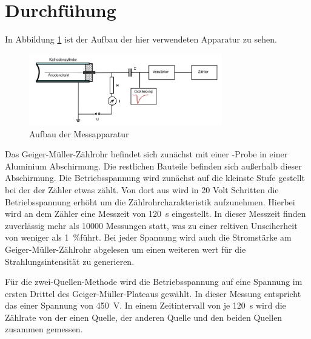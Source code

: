\section{Durchfühung}
In Abbildung \ref{fig:01_teo} ist der Aufbau der hier verwendeten Apparatur zu sehen.
\begin{figure}
    \centering
    \includegraphics[width = 0.75\textwidth]{14_v703/Abbildungen/Seite 2.pdf}
    \caption{Aufbau der Messapparatur \cite{man:v703}}
    \label{fig:01_teo}
\end{figure}
Das Geiger-Müller-Zählrohr befindet sich zunächst mit einer -Probe in einer Aluminium Abschirmung.
Die restlichen Bauteile befinden sich außerhalb dieser Abschirmung.
Die Betriebsspannung wird zunächst auf die kleinste Stufe gestellt bei der der Zähler etwas zählt.
Von dort aus wird in 20 Volt Schritten die Betriebsspannung erhöht um die Zählrohrcharakteristik aufzunehmen.
Hierbei wird an dem Zähler eine Messzeit von \qty{120}{\s} eingestellt.
In dieser Messzeit finden zuverlässig mehr als \num{10000} Messungen statt, was zu einer reltiven Unsciherheit von weniger als \qty{1}{\percent}führt.
Bei jeder Spannung wird auch die Stromstärke am Geiger-Müller-Zählrohr abgelesen um einen weiteren wert für die Strahlungsintensität zu generieren.

Für die zwei-Quellen-Methode wird die Betriebsspannung auf eine Spannung im ersten Drittel des Geiger-Müller-Plateaus gewählt.
In dieser Messung entspricht das einer Spannung von \qty{450}{\volt}.
In einem Zeitintervall von je \qty{120}{\s} wird die Zählrate von der einen Quelle, der anderen Quelle und den beiden Quellen zusammen gemessen.